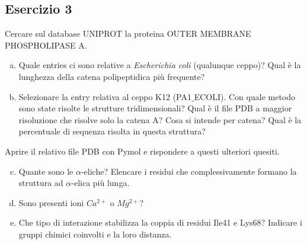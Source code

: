 \documentclass{article}
\begin{document}
\subsection*{Esercizio 3}
Cercare sul database UNIPROT la proteina OUTER MEMBRANE PHOSPHOLIPASE A.
\begin{enumerate}[a)]
   \item Quale entries ci sono relative a \textit{Escherichia coli} (qualunque ceppo)? Qual è la lunghezza della catena polipeptidica più frequente?
   \item Selezionare la entry relativa al ceppo K12 (PA1$\_$ECOLI). Con quale metodo sono state risolte le strutture tridimensionali? Qual è il file PDB a maggior risoluzione che risolve solo la catena A? Cosa si intende per catena? Qual è la percentuale di sequenza risolta in questa struttura?
\end{enumerate}
Aprire il relativo file PDB con Pymol e rispondere a questi ulteriori quesiti.
\begin{enumerate}[a)]
   \setcounter{enumi}{2}
   \item Quante sono le $\alpha$-eliche? Elencare i residui che complessivamente formano la struttura ad $\alpha$-elica più lunga.
   \item Sono presenti ioni $Ca^{2+}$ o $Mg^{2+}$?
   \item Che tipo di interazione stabilizza la coppia di residui Ile41 e Lys68? Indicare i gruppi chimici coinvolti e la loro distanza.
\end{enumerate}
\end{document}
